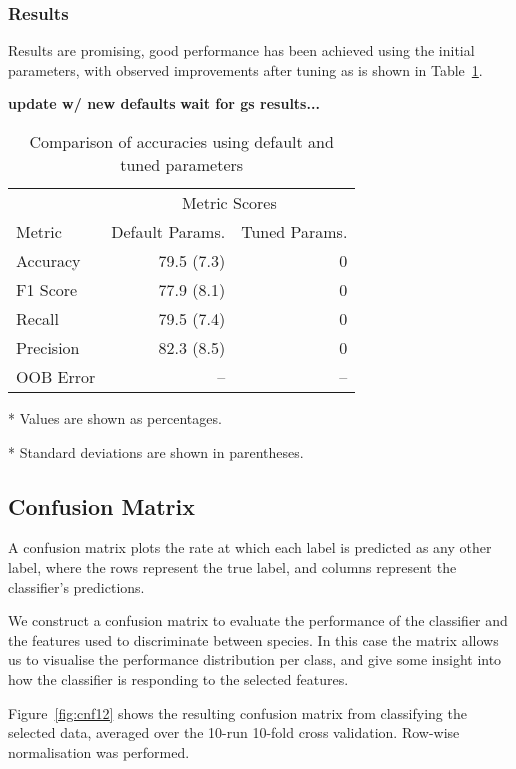\subsubsection{Results}
Results are promising, good performance has been achieved using the initial
parameters, with observed improvements after tuning as is shown in
Table~\ref{tbl:acc_before_after}.

\textbf{update w/ new defaults}
\textbf{wait for gs results... }
\begin{table}[!htb]
  \centering
  \caption{Comparison of accuracies using default and tuned parameters}
  \label{tbl:acc_before_after}
  \begin{threeparttable}
    \begin{tabular}{l r r}
      & \multicolumn{2}{c}{Metric Scores} \\
      Metric    & Default Params. & Tuned Params. \\ \hline
      Accuracy  & 79.5 (7.3) & 0 \\
      F1 Score  & 77.9 (8.1) & 0 \\
      Recall    & 79.5 (7.4) & 0 \\
      Precision & 82.3 (8.5) & 0 \\
      OOB Error & -- & --
    \end{tabular}
    \begin{tablenotes}
      \footnotesize
      \item[*] Values are shown as percentages.
      \item[*] Standard deviations are shown in parentheses.
    \end{tablenotes}
  \end{threeparttable}
\end{table}

\subsection{Confusion Matrix}
A confusion matrix plots the rate at which each label is predicted as any other
label, where the rows represent the true label, and columns represent the
classifier's predictions.

We construct a confusion matrix to evaluate the performance of the classifier
and the features used to discriminate between species.
In this case the matrix allows us to visualise the performance distribution per
class, and give
some insight into how the classifier is responding to the selected features.

Figure~\ref{fig:cnf12} shows the resulting confusion matrix from classifying the
selected data, averaged over the 10-run 10-fold cross validation.
Row-wise normalisation was performed.

